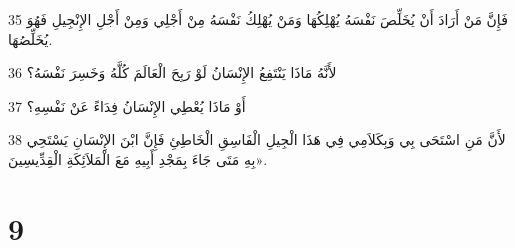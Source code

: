 \par 35 فَإِنَّ مَنْ أَرَادَ أَنْ يُخَلِّصَ نَفْسَهُ يُهْلِكُهَا وَمَنْ يُهْلِكُ نَفْسَهُ مِنْ أَجْلِي وَمِنْ أَجْلِ الإِنْجِيلِ فَهُوَ يُخَلِّصُهَا.
\par 36 لأَنَّهُ مَاذَا يَنْتَفِعُ الإِنْسَانُ لَوْ رَبِحَ الْعَالَمَ كُلَّهُ وَخَسِرَ نَفْسَهُ؟
\par 37 أَوْ مَاذَا يُعْطِي الإِنْسَانُ فِدَاءً عَنْ نَفْسِهِ؟
\par 38 لأَنَّ مَنِ اسْتَحَى بِي وَبِكَلاَمِي فِي هَذَا الْجِيلِ الْفَاسِقِ الْخَاطِئِ فَإِنَّ ابْنَ الإِنْسَانِ يَسْتَحِي بِهِ مَتَى جَاءَ بِمَجْدِ أَبِيهِ مَعَ الْمَلاَئِكَةِ الْقِدِّيسِينَ».

\chapter{9}

